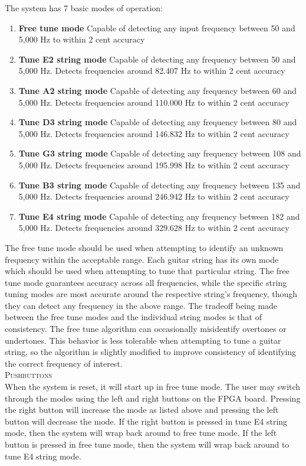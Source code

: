 \documentclass[aps,letterpaper,10pt]{revtex4}
\begin{document}
The system has 7 basic modes of operation:
\begin{enumerate}
\item \textbf{Free tune mode} Capable of detecting any input frequency between 50 and 5,000 Hz to within 2 cent accuracy
\item \textbf{Tune E2 string mode} Capable of detecting any frequency between 50 and 5,000 Hz. Detects frequencies around 82.407 Hz to within 2 cent accuracy
\item \textbf{Tune A2 string mode} Capable of detecting any frequency between 60 and 5,000 Hz. Detects frequencies around 110.000 Hz to within 2 cent accuracy
\item \textbf{Tune D3 string mode} Capable of detecting any frequency between 80 and 5,000 Hz. Detects frequencies around 146.832 Hz to within 2 cent accuracy
\item \textbf{Tune G3 string mode} Capable of detecting any frequency between 108 and 5,000 Hz. Detects frequencies around 195.998 Hz to within 2 cent accuracy
\item \textbf{Tune B3 string mode} Capable of detecting any frequency between 135 and 5,000 Hz. Detects frequencies around 246.942 Hz to within 2 cent accuracy
\item \textbf{Tune E4 string mode} Capable of detecting any frequency between 182 and 5,000 Hz. Detects frequencies around 329.628 Hz to within 2 cent accuracy
\end{enumerate}

The free tune mode should be used when attempting to identify an unknown frequency within the acceptable range. Each guitar string has its own mode which should be used when attempting to tune that particular string. The free tune mode guarantees accuracy across all frequencies, while the specific string tuning modes are most accurate around the respective string's frequency, though they can detect any frequency in the above range. The tradeoff being made between the free tune modes and the individual string modes is that of consistency. The free tune algorithm can occasionally misidentify overtones or undertones. This behavior is less tolerable when attempting to tune a guitar string, so the algorithm is slightly modified to improve consistency of identifying the correct frequency of interest. \\

\textsc{Pushbuttons} \\

When the system is reset, it will start up in free tune mode. The user may switch through the modes using the left and right buttons on the FPGA board. Pressing the right button will increase the mode as listed above and pressing the left button will decrease the mode. If the right button is pressed in tune E4 string mode, then the system will wrap back around to free tune mode. If the left button is pressed in free tune mode, then the system will wrap back around to tune E4 string mode. \\
\end{document}
